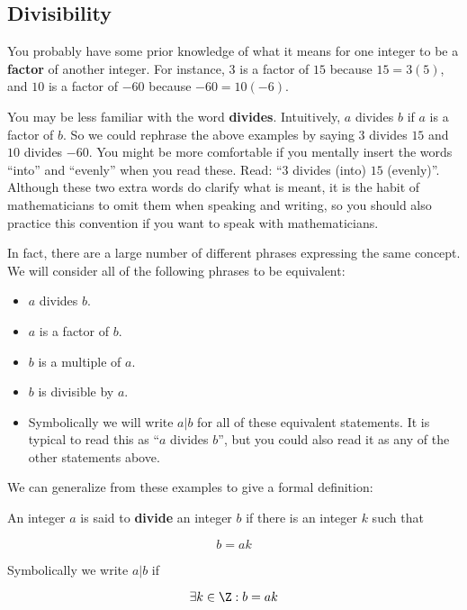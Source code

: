 \subsection{Divisibility}

You probably have some prior knowledge of what it means for one integer to be a \textbf{factor} of another integer.  For instance, $3$ is a factor of $15$ because $15 = 3(5)$, and $10$ is a factor of $-60$ because $-60 = 10(-6)$.  

You may be less familiar with the word \textbf{divides}.  Intuitively, $a$ divides $b$ if $a$ is a factor of $b$.  So we could rephrase the above examples by saying $3$ divides $15$ and $10$ divides $-60$.  You might be more comfortable if you mentally insert the words ``into'' and ``evenly'' when you read these.  Read:  ``$3$ divides (into) $15$ (evenly)''.  Although these two extra words do clarify what is meant, it is the habit of mathematicians to omit them when speaking and writing, so you should also practice this convention if you want to speak with mathematicians.

In fact, there are a large number of different phrases expressing the same concept.  We will consider all of the following phrases to be equivalent:

\begin{itemize}
	\item $a$ divides $b$.
	\item $a$ is a factor of $b$.
	\item $b$ is a multiple of $a$.
	\item $b$ is divisible by $a$.
	\item Symbolically we will write $a|b$ for all of these equivalent statements.  It is typical to read this as ``$a$ divides $b$'', but you could also read it as any of the other statements above.
\end{itemize}

We can generalize from these examples to give a formal definition:

\medskip

\begin{definition}
	An integer $a$ is said to \textbf{divide} an integer $b$ if there is an integer $k$ such that
	
	$$
	b = ak
	$$
	
	Symbolically we write  $a|b$ if 
	
	$$
	\exists k \in \Z: b=ak
	$$
\end{definition}


